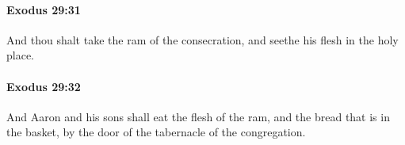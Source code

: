 		\paragraph{Exodus 29:31} %
			\label{EXODUS-29-31}

			And thou shalt take the ram of the consecration, and seethe his flesh in the holy place.


		\paragraph{Exodus 29:32} %
			\label{EXODUS-29-32}

			And Aaron and his sons shall eat the flesh of the ram, and the bread that is in the basket, by the door of the tabernacle of the congregation.



